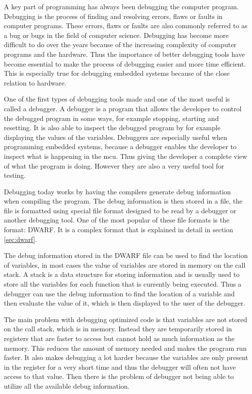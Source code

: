 
A key part of programming has always been debugging the computer program.
Debugging is the process of finding and resolving errors, flaws or faults in computer programs.
These errors, flaws or faults are also commonly referred to as a bug or bugs in the field of computer science.
Debugging has become more difficult to do over the years because of the increasing complexity of computer programs and the hardware.
Thus the importance of better debugging tools have become essential to make the process of debugging easier and more time efficient.
This is especially true for debugging  embedded systems because of the close relation to hardware.


One of the first types of debugging tools made and one of the most useful is called a debugger.
A debugger is a program that allows the developer to control the debugged program in some ways, for example stopping, starting and resetting.
It is also able to inspect the debugged program by for example displaying the values of the variables.
Debuggers are especially useful when programming embedded systems, because a debugger enables the developer to inspect what is happening in the \gls{mcu}.
Thus giving the developer a complete view of what the program is doing.
However they are also a very useful tool for testing.


Debugging today works by having the compilers generate debug information when compiling the program.
The debug information is then stored in a file, the file is formatted using special file format designed to be read by a debugger or another debugging tool.
One of the most popular of these file formats is the format: \gls{DWARF}.
It is a complex format that is explained in detail in section \ref{sec:dwarf}.


The debug information stored in the \gls{DWARF} file can be used to find the location of variables, in most cases the value of variables are stored in memory on the call stack.
A stack is a data structure for storing information and is usually used to store all the variables for each function that is currently being executed.
Thus a debugger can use the debug information to find the location of a variable and then evaluate the value of it, which is then displayed to the user of the debugger.


The main problem with debugging optimized code is that variables are not stored on the call stack, which is in memory.
Instead they are temporarily stored in registers that are faster to access but cannot hold as much information as the memory.
This reduces the amount of memory needed and makes the program run faster.
It also makes debugging a lot harder because the variables are only present in the register for a very short time and thus the debugger will often not have access to that value.
Then there is the problem of debugger not being able to utilize all the available debug information.


